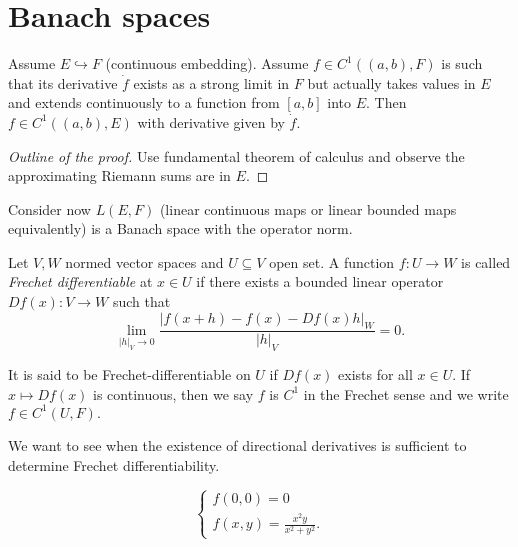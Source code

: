 \section*{Banach spaces}

\begin{prop}
    Assume $E \hookrightarrow F$ (continuous embedding). Assume $f \in C^1((a,b), F)$ is such that its derivative $\dot{f}$ exists as a strong limit in $F$ but actually takes values in $E$ and extends continuously to a function from $[a,b]$ into $E$. Then $f \in C^1((a,b), E)$ with derivative given by $\dot{f}.$
\end{prop}
\begin{proof}[Outline of the proof]
    Use fundamental theorem of calculus and observe the approximating Riemann sums are in $E$.
\end{proof}

Consider now $L(E,F)$ (linear continuous maps or linear bounded maps equivalently) is a Banach space with the operator norm.

\begin{definition}
    Let $V, W$ normed vector spaces and $U \subseteq V$ open set. 
    A function $f:U \rightarrow W$ is called \textit{Frechet differentiable} at $x \in U$ if there exists a
    bounded linear operator $Df(x): V \rightarrow W$ such that
    \begin{equation}
        \lim_{|h|_V \rightarrow 0} \frac{|f(x + h) - f(x) - Df(x) h|_W}{|h|_V} = 0.
    \end{equation}

    It is said to be Frechet-differentiable on $U$ if $Df(x)$ exists for all $x \in U.$
    If $x \mapsto Df(x)$ is continuous, then we say $f$ is $C^1$ in the Frechet sense and we write $f \in C^1(U,F).$
\end{definition}

We want to see when the existence of directional derivatives is sufficient to determine Frechet differentiability.

\begin{example}
    \begin{equation}
        \begin{cases}
            f(0,0) = 0 \\
            f(x,y) = \frac{x^2 y}{x^2 + y^2}. 
        \end{cases}
    \end{equation}
\end{example}

